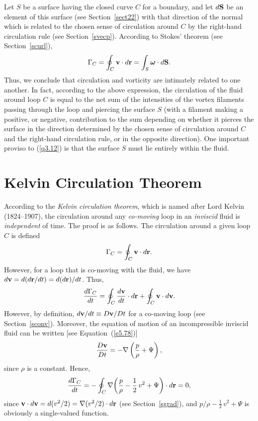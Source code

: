 Let $S$ be a surface having the closed curve $C$ for a boundary, and let $d{\bf S}$ be an element of this surface (see Section~\ref{sect22})  with that direction of the normal which is related to the chosen sense of circulation around $C$ by the right-hand
circulation rule (see Section~\ref{svecp}).  According to Stokes' theorem (see Section~\ref{scurl}),
\begin{equation}\label{q3.12}
\Gamma_C= \oint_C {\bf v}\cdot d{\bf r} = \int_S \mbox{\boldmath$\omega$}\cdot d{\bf S}.
\end{equation}
Thus, we conclude that circulation and vorticity are intimately related to one another. In fact, according to the
 above expression, the circulation of the fluid around loop $C$ is equal to the net sum of the  intensities of the
 vortex filaments passing through the loop and piercing the surface $S$ (with a filament making a
 positive, or negative, contribution to the sum depending on whether it pierces the surface
 in the direction determined by the chosen sense of circulation around $C$ and the right-hand circulation rule, or in the opposite direction). 
 One important proviso to (\ref{q3.12}) is that the surface $S$ must lie entirely within the fluid. 

\section{Kelvin Circulation Theorem}\label{skelvin}
According to the {\em Kelvin circulation theorem}, which is named after Lord Kelvin  (1824--1907),  the
circulation around any {\em co-moving}\/ loop in an
{\em inviscid}\/ fluid  is {\em independent}\/ of time. The
proof is as follows. The circulation around a given loop $C$ is defined
\begin{equation}
\Gamma_C = \oint_C {\bf v}\cdot d{\bf r}.
\end{equation}
However, for a loop that is co-moving with the fluid, we have $d{\bf v} = d(d{\bf r}/dt)= d(d{\bf r})/dt$. Thus,
\begin{equation}
\frac{d\Gamma_C}{dt} = \oint_C \frac{d{\bf v}}{dt}\cdot d{\bf r} + \oint_C {\bf v}\cdot d{\bf v}.
\end{equation}
However, by definition, $d{\bf v}/dt\equiv D{\bf v}/Dt$ for a co-moving loop (see Section~\ref{sconv}). Moreover, the equation of motion of
an incompressible inviscid fluid can be written [see Equation~(\ref{e5.78})]
\begin{equation}
\frac{D{\bf v}}{Dt}=   - \nabla\left(\frac{p}{\rho}+\Psi\right),
\end{equation}
since $\rho$ is a constant. Hence, 
\begin{equation}
\frac{d\Gamma_C}{dt} =- \oint_C\nabla\!\left(\frac{p}{\rho}- \frac{1}{2}\,v^2+\Psi\right)\cdot d{\bf r}= 0,
\end{equation}
since ${\bf v}\cdot d{\bf v} = d(v^2/2)=\nabla(v^2/2)\cdot d{\bf r}$ (see Section~\ref{sgrad}), and $p/\rho -\frac{1}{2}\,v^2+\Psi$ is obviously a single-valued function. 

